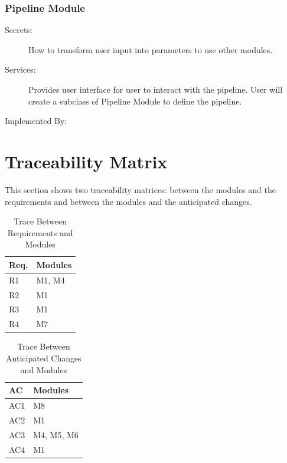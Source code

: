 \documentclass[12pt, titlepage]{article}
\begin{document}
\subsubsection{Pipeline Module}


\begin{description}
    \item[Secrets:] How to transform user input into parameters to use other modules.
    \item[Services:] Provides user interface for user to interact with the pipeline. User will create a subclass of Pipeline Module to define the pipeline.
    \item[Implemented By:] \progname
\end{description}
\section{Traceability Matrix} \label{SecTM}


This section shows two traceability matrices: between the modules and the
requirements and between the modules and the anticipated changes.


\begin{table}[H]
\centering
\begin{tabular}{p{} p{}}
\toprule
    \textbf{Req.} & \textbf{Modules}\\
\midrule
    R1 & M1, M4 \\
    R2 & M1 \\
    R3 & M1 \\
    R4 & M7 \\
\bottomrule
\end{tabular}
\caption{Trace Between Requirements and Modules}
\label{TblRT}
\end{table}


\begin{table}[H]
\centering
\begin{tabular}{p{} p{}}
\toprule
    \textbf{AC} & \textbf{Modules}\\
\midrule
    AC1 & M8 \\
    AC2 & M1 \\
    AC3 & M4, M5, M6 \\
    AC4 & M1 \\
\bottomrule
\end{tabular}
\caption{Trace Between Anticipated Changes and Modules}
\label{TblACT}
\end{table}
\end{document}
